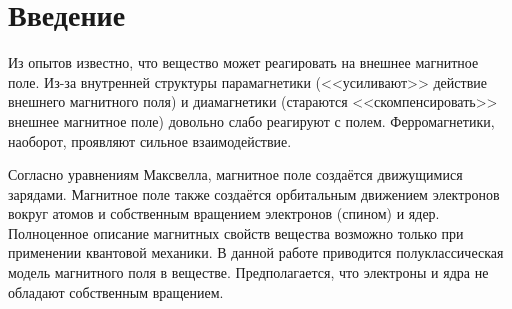 \section*{Введение}

Из опытов известно, что вещество может реагировать на внешнее магнитное поле. Из-за внутренней структуры парамагнетики (<<усиливают>> действие внешнего магнитного поля) и диамагнетики (стараются <<скомпенсировать>> внешнее магнитное поле) довольно слабо реагируют с полем. Ферромагнетики, наоборот, проявляют сильное взаимодействие.

Согласно уравнениям Максвелла, магнитное поле создаётся движущимися зарядами. Магнитное поле также создаётся орбитальным движением электронов вокруг атомов и собственным вращением электронов (спином) и ядер. Полноценное описание магнитных свойств вещества возможно только при применении квантовой механики. В данной работе приводится полуклассическая модель магнитного поля в веществе. Предполагается, что электроны и ядра не обладают собственным вращением.

